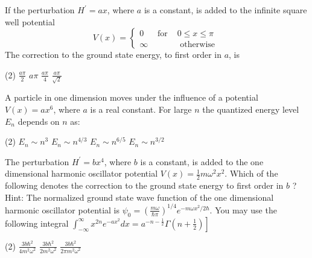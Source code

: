  \begin{enumerate}
 \begin{minipage}{\textwidth}
 	\item If the perturbation $H^{\prime}=a x$, where $a$ is a constant, is added to the infinite square well potential
 	$$
 	V(x)=\left\{\begin{array}{lll}
 	0 & \text { for } & 0 \leq x \leq \pi \\
 	\infty & & \text { otherwise }
 	\end{array}\right.
 	$$
 	The correction to the ground state energy, to first order in $a$, is
 \end{minipage}
 \begin{tasks}(2)
 	\task[\textbf{A.}] $\frac{a \pi}{2}$
 	\task[\textbf{B.}]$a \pi$
 	\task[\textbf{C.}]$\frac{a \pi}{4}$
 	\task[\textbf{D.}]$\frac{a \pi}{\sqrt{2}}$
 \end{tasks}
\begin{minipage}{\textwidth}
	\item A particle in one dimension moves under the influence of a potential $V(x)=a x^{6}$, where $a$ is a real constant. For large $n$ the quantized energy level $E_{n}$ depends on $n$ as:
\end{minipage}
\begin{tasks}(2)
	\task[\textbf{A.}] $E_{n} \sim n^{3}$
	\task[\textbf{B.}]$E_{n} \sim n^{4 / 3}$
	\task[\textbf{C.}]$E_{n} \sim n^{6 / 5}$
	\task[\textbf{D.}]$E_{n} \sim n^{3 / 2}$
\end{tasks}
\begin{minipage}{\textwidth}
	\item The perturbation $H^{\prime}=b x^{4}$, where $b$ is a constant, is added to the one dimensional harmonic oscillator potential $V(x)=\frac{1}{2} m \omega^{2} x^{2}$. Which of the following denotes the correction to the ground state energy to first order in $b$ ?
	Hint: The normalized ground state wave function of the one dimensional harmonic oscillator potential is $\psi_{0}=\left(\frac{m \omega}{\hbar \pi}\right)^{1 / 4} e^{-m \omega x^{2} / 2 \hbar} .$ You may use the following integral $\left.\int_{-\infty}^{\infty} x^{2 n} e^{-a x^{2}} d x=a^{-n-\frac{1}{2}} \Gamma\left(n+\frac{1}{2}\right)\right]$
\end{minipage}
\begin{tasks}(2)
	\task[\textbf{A.}] $\frac{3 b \hbar^{2}}{4 m^{2} \omega^{2}}$
	\task[\textbf{B.}]$\frac{3 b \hbar^{2}}{2 m^{2} \omega^{2}}$
	\task[\textbf{C.}]$\frac{3 b \hbar^{2}}{2 \pi m^{2} \omega^{2}}$

\end{tasks}
\end{enumerate}
